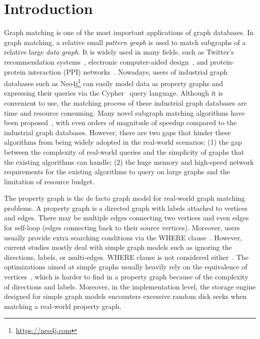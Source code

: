 \section{Introduction}
Graph matching
is one of the most important applications of graph databases. In graph matching, a relative small \emph{pattern graph} is used to match subgraphs of a relative large \emph{data graph}.
It is widely used in many fields,
such as Twitter's recommendation systems~\cite{DBLP:journals/pvldb/GuptaSGGZLL14,DBLP:journals/pvldb/SharmaJBLL16},
electronic computer-aided design~\cite{DBLP:conf/dac/OhlrichEGS93},
and protein-protein interaction (PPI) networks~\cite{milenkovic2008uncovering}.
Nowadays, users of industrial graph databases such as Neo4j\footnote{\url{https://neo4j.com}}
can easily model data as property graphs and expressing their queries via the Cypher~\cite{DBLP:conf/sigmod/FrancisGGLLMPRS18} query language.
Although it is convenient to use, the matching process of these industrial graph databases are time and resource consuming.
Many novel subgraph matching algorithms have been proposed~\cite{DBLP:journals/pvldb/SunWWSL12,DBLP:conf/sigmod/HanLL13,DBLP:conf/sigmod/ShaoCCMYX14,DBLP:conf/cloud/SerafiniMS17,DBLP:journals/pvldb/QiaoZC17,DBLP:conf/sigmod/DiasTGM019}, with even orders of magnitude of speedup compared to the industrial graph databases.
However, there are two gaps that hinder these algorithms from being widely adopted in the real-world scenarios:
(1) the gap between the complexity of real-world queries and the simplicity of graphs that the existing algorithms can handle;
(2) the huge memory and high-speed network requirements for the existing algorithms to query on large graphs and the limitation of resource budget.

The property graph is the de facto graph model for real-world graph matching problems.
A property graph is a directed graph with labels attached to vertices and edges.
There may be multiple edges connecting two vertices and even edges for self-loop (edges connecting back to their source vertices).
Moreover, users usually provide extra searching conditions via the WHERE clause~\cite{DBLP:journals/csur/AnglesABHRV17}. However,  current studies mostly deal with simple graph models such as ignoring the directions, labels, or multi-edges. WHERE clause is not considered either~\cite{DBLP:journals/pvldb/SunWWSL12,DBLP:conf/sigmod/HanLL13,DBLP:conf/sigmod/KimLBHLKJ16,DBLP:journals/pvldb/QiaoZC17,DBLP:journals/pvldb/MhedhbiS19}. The optimizations aimed at simple graphs usually heavily rely on the equivalence of vertices~\cite{DBLP:conf/sigmod/HanLL13,DBLP:journals/pvldb/QiaoZC17}, which is harder to find in a property graph because of the complexity of directions and labels. Moreover, in the implementation level, the storage engine designed for simple graph models encounters excessive random disk seeks when matching a real-world property graph.

